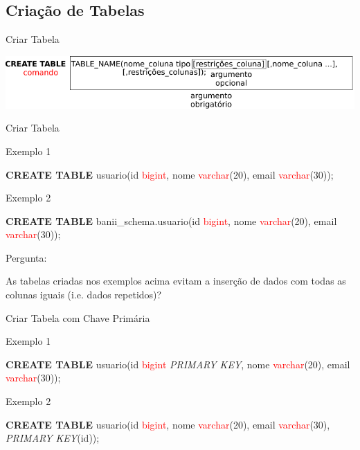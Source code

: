 \documentclass[xcolor=x11names,compress]{beamer}
\begin{document}
\subsection{Criação de Tabelas}

\begin{frame}{Criar Tabela}

\centering \includegraphics[keepaspectratio,width=\textwidth]{create_table}

\end{frame}

\begin{frame}{Criar Tabela}

\begin{alertblock}{Exemplo 1}

\textbf{CREATE TABLE} usuario(id \textcolor{red}{bigint}, nome \textcolor{red}{varchar}(20), email \textcolor{red}{varchar}(30));

\end{alertblock}

\begin{alertblock}{Exemplo 2}

\textbf{CREATE TABLE} banii\_schema.usuario(id \textcolor{red}{bigint}, nome \textcolor{red}{varchar}(20), email \textcolor{red}{varchar}(30));

\end{alertblock}

\pause 

\begin{alertblock}{\centering Pergunta:}

As tabelas criadas nos exemplos acima evitam a inserção de dados com todas as colunas iguais (i.e. dados repetidos)?

\end{alertblock}

\end{frame}

\begin{frame}{Criar Tabela com Chave Primária}

\begin{alertblock}{Exemplo 1}

\textbf{CREATE TABLE} usuario(id \textcolor{red}{bigint} \textit{PRIMARY KEY}, nome \textcolor{red}{varchar}(20), email \textcolor{red}{varchar}(30));

\end{alertblock}

\begin{alertblock}{Exemplo 2}

\textbf{CREATE TABLE} usuario(id \textcolor{red}{bigint}, nome \textcolor{red}{varchar}(20), email \textcolor{red}{varchar}(30), \textit{PRIMARY KEY}(id));

\end{alertblock}

\end{frame}
\end{document}
